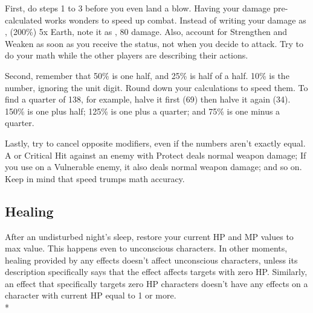 \begin{multicols}{2}
\begin{boco}
First, do steps 1 to 3 before you even land a blow. Having your damage pre-calculated works wonders to speed up combat. Instead of writing your damage as , (200\%) 5x Earth, note it as , 80 damage. Also, account for Strengthen and Weaken as soon as you receive the status, not when you decide to attack. Try to do your math while the other players are describing their actions.

Second, remember that 50\% is one half, and 25\% is half of a half. 10\% is the number, ignoring the unit digit. Round down your calculations to speed them. To find a quarter of 138, for example, halve it first (69) then halve it again (34). 150\% is one plus half; 125\% is one plus a quarter; and 75\% is one minus a quarter.

Lastly, try to cancel opposite modifiers, even if the numbers aren't exactly equal. A  or Critical Hit against an enemy with Protect deals normal weapon damage; If you use  on a Vulnerable enemy, it also deals normal weapon damage; and so on. Keep in mind that speed trumps math accuracy.
\end{boco}

\subsection{Healing}\label{subsec:heal}
After an undisturbed night's sleep, restore your current HP and MP values to max value. This happens even to unconscious characters. In other moments, healing provided by any effects doesn’t affect unconscious characters, unless its description specifically says that the effect affects targets with zero HP\@. Similarly, an effect that specifically targets zero HP characters doesn’t have any effects on a character with current HP equal to 1 or more.\\*
\end{multicols}

